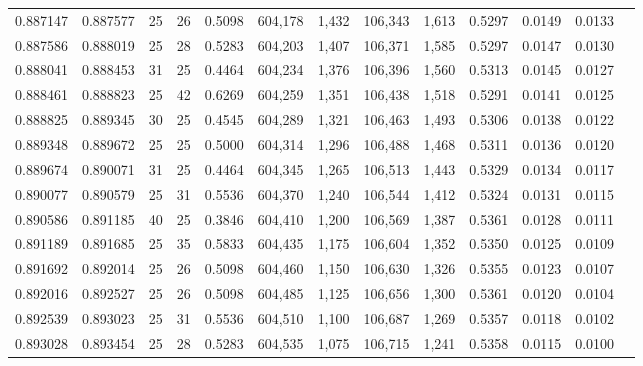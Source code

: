 \begin{tabular}{rrrrrrrrrrrrr}
0.887147 & 0.887577 &    25 &  26 &                                     0.5098 & 604,178 &   1,432 & 106,343 &   1,613 & 0.5297 & 0.0149 & 0.0133 \\
0.887586 & 0.888019 &    25 &  28 &                                     0.5283 & 604,203 &   1,407 & 106,371 &   1,585 & 0.5297 & 0.0147 & 0.0130 \\
0.888041 & 0.888453 &    31 &  25 &                                     0.4464 & 604,234 &   1,376 & 106,396 &   1,560 & 0.5313 & 0.0145 & 0.0127 \\
0.888461 & 0.888823 &    25 &  42 &                                     0.6269 & 604,259 &   1,351 & 106,438 &   1,518 & 0.5291 & 0.0141 & 0.0125 \\
0.888825 & 0.889345 &    30 &  25 &                                     0.4545 & 604,289 &   1,321 & 106,463 &   1,493 & 0.5306 & 0.0138 & 0.0122 \\
0.889348 & 0.889672 &    25 &  25 &                                     0.5000 & 604,314 &   1,296 & 106,488 &   1,468 & 0.5311 & 0.0136 & 0.0120 \\
0.889674 & 0.890071 &    31 &  25 &                                     0.4464 & 604,345 &   1,265 & 106,513 &   1,443 & 0.5329 & 0.0134 & 0.0117 \\
0.890077 & 0.890579 &    25 &  31 &                                     0.5536 & 604,370 &   1,240 & 106,544 &   1,412 & 0.5324 & 0.0131 & 0.0115 \\
0.890586 & 0.891185 &    40 &  25 &                                     0.3846 & 604,410 &   1,200 & 106,569 &   1,387 & 0.5361 & 0.0128 & 0.0111 \\
0.891189 & 0.891685 &    25 &  35 &                                     0.5833 & 604,435 &   1,175 & 106,604 &   1,352 & 0.5350 & 0.0125 & 0.0109 \\
0.891692 & 0.892014 &    25 &  26 &                                     0.5098 & 604,460 &   1,150 & 106,630 &   1,326 & 0.5355 & 0.0123 & 0.0107 \\
0.892016 & 0.892527 &    25 &  26 &                                     0.5098 & 604,485 &   1,125 & 106,656 &   1,300 & 0.5361 & 0.0120 & 0.0104 \\
0.892539 & 0.893023 &    25 &  31 &                                     0.5536 & 604,510 &   1,100 & 106,687 &   1,269 & 0.5357 & 0.0118 & 0.0102 \\
0.893028 & 0.893454 &    25 &  28 &                                     0.5283 & 604,535 &   1,075 & 106,715 &   1,241 & 0.5358 & 0.0115 & 0.0100 \\

\end{tabular}
